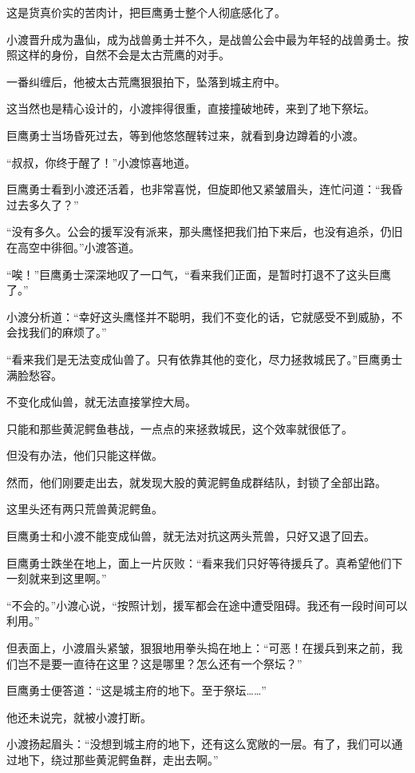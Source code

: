 \begin{this_body}
这是货真价实的苦肉计，把巨鹰勇士整个人彻底感化了。

小渡晋升成为蛊仙，成为战兽勇士并不久，是战兽公会中最为年轻的战兽勇士。按照这样的身份，自然不会是太古荒鹰的对手。

一番纠缠后，他被太古荒鹰狠狠拍下，坠落到城主府中。

这当然也是精心设计的，小渡摔得很重，直接撞破地砖，来到了地下祭坛。

巨鹰勇士当场昏死过去，等到他悠悠醒转过来，就看到身边蹲着的小渡。

“叔叔，你终于醒了！”小渡惊喜地道。

巨鹰勇士看到小渡还活着，也非常喜悦，但旋即他又紧皱眉头，连忙问道：“我昏过去多久了？”

“没有多久。公会的援军没有派来，那头鹰怪把我们拍下来后，也没有追杀，仍旧在高空中徘徊。”小渡答道。

“唉！”巨鹰勇士深深地叹了一口气，“看来我们正面，是暂时打退不了这头巨鹰了。”

小渡分析道：“幸好这头鹰怪并不聪明，我们不变化的话，它就感受不到威胁，不会找我们的麻烦了。”

“看来我们是无法变成仙兽了。只有依靠其他的变化，尽力拯救城民了。”巨鹰勇士满脸愁容。

不变化成仙兽，就无法直接掌控大局。

只能和那些黄泥鳄鱼巷战，一点点的来拯救城民，这个效率就很低了。

但没有办法，他们只能这样做。

然而，他们刚要走出去，就发现大股的黄泥鳄鱼成群结队，封锁了全部出路。

这里头还有两只荒兽黄泥鳄鱼。

巨鹰勇士和小渡不能变成仙兽，就无法对抗这两头荒兽，只好又退了回去。

巨鹰勇士跌坐在地上，面上一片灰败：“看来我们只好等待援兵了。真希望他们下一刻就来到这里啊。”

“不会的。”小渡心说，“按照计划，援军都会在途中遭受阻碍。我还有一段时间可以利用。”

但表面上，小渡眉头紧皱，狠狠地用拳头捣在地上：“可恶！在援兵到来之前，我们岂不是要一直待在这里？这是哪里？怎么还有一个祭坛？”

巨鹰勇士便答道：“这是城主府的地下。至于祭坛……”

他还未说完，就被小渡打断。

小渡扬起眉头：“没想到城主府的地下，还有这么宽敞的一层。有了，我们可以通过地下，绕过那些黄泥鳄鱼群，走出去啊。”


\end{this_body}
